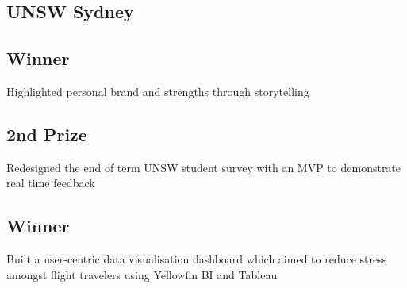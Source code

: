 \documentclass[11pt, a4paper]{MagicalCV}
\begin{document}
\begin{minipage}[t]{0.38\textwidth}
\sectionsep
\subsection{UNSW Sydney}
\vspace{\topsep} %
\sectionsep

\sectionsep
\subsection{Winner}
Highlighted personal brand and strengths through storytelling
\sectionsep

\subsection{2nd Prize}
Redesigned the end of term UNSW student survey with an MVP to demonstrate real time feedback
\sectionsep

\subsection{Winner}
Built a user-centric data visualisation dashboard which aimed to reduce stress amongst flight travelers using Yellowfin BI and Tableau
\sectionsep

\end{minipage} 
\hfill
\end{document}
